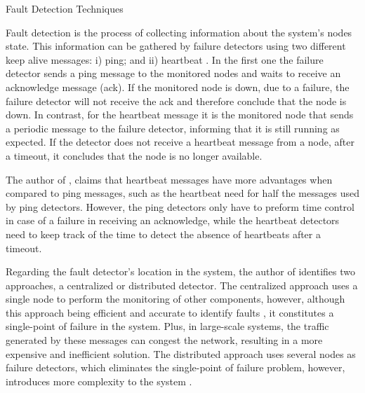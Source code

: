 \begin{Paragraph}{Fault Detection Techniques}
	
	Fault detection is the process of collecting information about the system’s nodes state. This information can be gathered by failure detectors using two different keep alive messages: i) ping; and ii) heartbeat \cite{Zaiter2013}. In the first one the failure detector sends a ping message to the monitored nodes and waits to receive an acknowledge message (ack). If the monitored node is down, due to a failure, the failure detector will not receive the ack and therefore conclude that the node is down. In contrast, for the heartbeat message it is the monitored node that sends a periodic message to the failure detector, informing that it is still running as expected. If the detector does not receive a heartbeat message from a node, after a timeout, it concludes that the node is no longer available.
	
	The author of \cite{Zaiter2013}, claims that heartbeat messages have more advantages when compared to ping messages, such as the heartbeat need for half the messages used by ping detectors. However, the ping detectors only have to preform time control in case of a failure in receiving an acknowledge, while the heartbeat detectors need to keep track of the time to detect the absence of heartbeats after a timeout.
	
	Regarding the fault detector’s location in the system, the author of \cite{kshir} identifies two approaches, a centralized or distributed detector. The centralized approach uses a single node to perform the monitoring of other components, however, although this approach being efficient and accurate to identify faults \cite{kshir}, it constitutes a single-point of failure in the system. Plus, in large-scale systems, the traffic generated by these messages can congest the network, resulting in a more expensive and inefficient solution. The distributed approach uses several nodes as failure detectors, which eliminates the single-point of failure problem, however, introduces more complexity to the system \cite{Zaiter2013}. 
	
	
\end{Paragraph}

